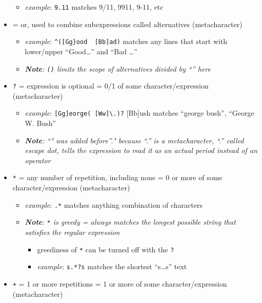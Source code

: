 \documentclass[
]{article}
\providecommand{\tightlist}{%
  \setlength{\itemsep}{0pt}\setlength{\parskip}{0pt}}
\begin{document}
\begin{itemize}
  \begin{itemize}
  \tightlist
  \item
    \emph{example}: \texttt{9.11} matches 9/11, 9911, 9-11, etc
  \end{itemize}
\item
  \texttt{\textbar{}} = or, used to combine subexpressions called
  alternatives (metacharacter)

  \begin{itemize}
  \tightlist
  \item
    \emph{example}: \texttt{\^{}({[}Gg\}ood\ \textbar{}\ {[}Bb{]}ad)}
    matches any lines that start with lower/upper ``Good\ldots{}'' and
    ``Bad \ldots{}''
  \item
    \emph{\textbf{Note}: \texttt{()} limits the scope of alternatives
    divided by ``\textbar{}'' here }
  \end{itemize}
\item
  \texttt{?} = expression is optional = 0/1 of some character/expression
  (metacharacter)

  \begin{itemize}
  \tightlist
  \item
    \emph{example}: \texttt{{[}Gg{]}eorge(\ {[}Ww{]}\textbackslash{}.)?}
    {[}Bb{]}ush matches ``george bush'', ``George W. Bush''
  \item
    \emph{\textbf{Note}: ``" was added before''." because ``.'' is a
    metacharacter, ``.'' called escape dot, tells the expression to read
    it as an actual period instead of an operator }
  \end{itemize}
\item
  \texttt{*} = any number of repetition, including none = 0 or more of
  some character/expression (metacharacter)

  \begin{itemize}
  \tightlist
  \item
    \emph{example}: \texttt{.*} matches anything combination of
    characters
  \item
    \emph{\textbf{Note}: \texttt{*} is greedy = always matches the
    longest possible string that satisfies the regular expression }

    \begin{itemize}
    \tightlist
    \item
      greediness of \texttt{*} can be turned off with the \texttt{?}
    \item
      \emph{example}: \texttt{s.*?s} matches the shortest ``s\ldots s''
      text
    \end{itemize}
  \end{itemize}
\item
  \texttt{+} = 1 or more repetitions = 1 or more of some
  character/expression (metacharacter)


\end{itemize}
\end{document}

